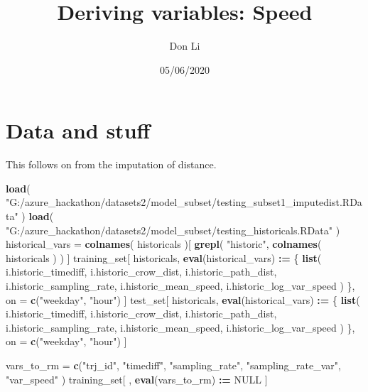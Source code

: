 \documentclass[]{article}
\title{Deriving variables: Speed}
\author{Don Li}
\date{05/06/2020}
\newenvironment{Shaded}{\begin{snugshade}}{\end{snugshade}}
\newcommand{\ErrorTok}[1]{\textcolor[rgb]{0.64,0.00,0.00}{\textbf{#1}}}
\newcommand{\KeywordTok}[1]{\textcolor[rgb]{0.13,0.29,0.53}{\textbf{#1}}}
\newcommand{\NormalTok}[1]{#1}
\newcommand{\OperatorTok}[1]{\textcolor[rgb]{0.81,0.36,0.00}{\textbf{#1}}}
\newcommand{\OtherTok}[1]{\textcolor[rgb]{0.56,0.35,0.01}{#1}}
\newcommand{\StringTok}[1]{\textcolor[rgb]{0.31,0.60,0.02}{#1}}
\begin{document}
\maketitle

\hypertarget{data-and-stuff}{%
\section{Data and stuff}\label{data-and-stuff}}

This follows on from the imputation of distance.

\begin{Shaded}
\begin{Highlighting}[]
\KeywordTok{load}\NormalTok{( }\StringTok{"G:/azure_hackathon/datasets2/model_subset/testing_subset1_imputedist.RData"}\NormalTok{ )}
\KeywordTok{load}\NormalTok{( }\StringTok{"G:/azure_hackathon/datasets2/model_subset/testing_historicals.RData"}\NormalTok{ )}
\NormalTok{historical_vars =}\StringTok{ }\KeywordTok{colnames}\NormalTok{( historicals )[}
    \KeywordTok{grepl}\NormalTok{( }\StringTok{"historic"}\NormalTok{, }\KeywordTok{colnames}\NormalTok{( historicals ) )}
\NormalTok{    ]}
\NormalTok{training_set[ historicals, }\KeywordTok{eval}\NormalTok{(historical_vars) }\OperatorTok{:}\ErrorTok{=}\StringTok{ }\NormalTok{\{}
    \KeywordTok{list}\NormalTok{( i.historic_timediff,}
\NormalTok{        i.historic_crow_dist,}
\NormalTok{        i.historic_path_dist,}
\NormalTok{        i.historic_sampling_rate,}
\NormalTok{        i.historic_mean_speed,}
\NormalTok{        i.historic_log_var_speed}
\NormalTok{    )}
\NormalTok{\}, on =}\StringTok{ }\KeywordTok{c}\NormalTok{(}\StringTok{"weekday"}\NormalTok{, }\StringTok{"hour"}\NormalTok{) ]}
\NormalTok{test_set[ historicals, }\KeywordTok{eval}\NormalTok{(historical_vars) }\OperatorTok{:}\ErrorTok{=}\StringTok{ }\NormalTok{\{}
    \KeywordTok{list}\NormalTok{( i.historic_timediff,}
\NormalTok{        i.historic_crow_dist,}
\NormalTok{        i.historic_path_dist,}
\NormalTok{        i.historic_sampling_rate,}
\NormalTok{        i.historic_mean_speed,}
\NormalTok{        i.historic_log_var_speed}
\NormalTok{    )}
\NormalTok{\}, on =}\StringTok{ }\KeywordTok{c}\NormalTok{(}\StringTok{"weekday"}\NormalTok{, }\StringTok{"hour"}\NormalTok{) ]}

\NormalTok{vars_to_rm =}\StringTok{ }\KeywordTok{c}\NormalTok{(}\StringTok{"trj_id"}\NormalTok{, }\StringTok{"timediff"}\NormalTok{, }\StringTok{"sampling_rate"}\NormalTok{,}
    \StringTok{"sampling_rate_var"}\NormalTok{, }\StringTok{"var_speed"}\NormalTok{ )}
\NormalTok{training_set[ , }\KeywordTok{eval}\NormalTok{(vars_to_rm) }\OperatorTok{:}\ErrorTok{=}\StringTok{ }\OtherTok{NULL}\NormalTok{ ]}
\end{Highlighting}
\end{Shaded}
\end{document}

